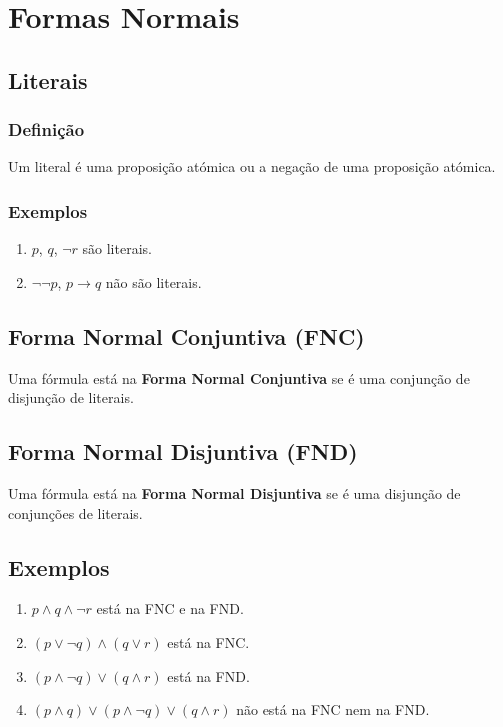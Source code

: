 \section{Formas Normais}
\label{sec:1-interpretacao-formas-normais}

\subsection{Literais}
\subsubsection{Definição}
Um literal é uma proposição atómica ou a negação de uma proposição atómica.

\subsubsection{Exemplos}
\begin{enumerate}
    \item $p$, $q$, $\neg r$ são literais.
    \item $\neg \neg p$, $p \rightarrow q$ não são literais.
\end{enumerate}

\subsection{Forma Normal Conjuntiva (FNC)}
Uma fórmula está na \textbf{Forma Normal Conjuntiva} se é uma conjunção de disjunção de literais.

\subsection{Forma Normal Disjuntiva (FND)}
Uma fórmula está na \textbf{Forma Normal Disjuntiva} se é uma disjunção de conjunções de literais.

\subsection{Exemplos}
\begin{enumerate}
    \item $p \land q \land \neg r$ está na FNC e na FND.
    \item $(p \lor \neg q) \land (q \lor r)$ está na FNC.
    \item $(p \land \neg q) \lor (q \land r)$ está na FND.
    \item $(p \land q) \lor (p \land \neg q) \lor (q \land r)$ não está na FNC nem na FND.
\end{enumerate}


